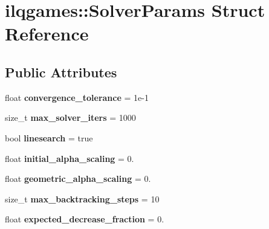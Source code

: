 \hypertarget{structilqgames_1_1_solver_params}{}\section{ilqgames\+:\+:Solver\+Params Struct Reference}
\label{structilqgames_1_1_solver_params}
\subsection*{Public Attributes}
\begin{DoxyCompactItemize}
\item 
float {\bfseries convergence\+\_\+tolerance} = 1e-\/1\hypertarget{structilqgames_1_1_solver_params_afe3985198f617a446e43e3d3a3c6ed2e}{}\label{structilqgames_1_1_solver_params_afe3985198f617a446e43e3d3a3c6ed2e}

\item 
size\+\_\+t {\bfseries max\+\_\+solver\+\_\+iters} = 1000\hypertarget{structilqgames_1_1_solver_params_a525076d6ad3f90a2fc5c410d88dc090f}{}\label{structilqgames_1_1_solver_params_a525076d6ad3f90a2fc5c410d88dc090f}

\item 
bool {\bfseries linesearch} = true\hypertarget{structilqgames_1_1_solver_params_af5c0bdc01591507e9a83f686a5be8e49}{}\label{structilqgames_1_1_solver_params_af5c0bdc01591507e9a83f686a5be8e49}

\item 
float {\bfseries initial\+\_\+alpha\+\_\+scaling} = 0.\hypertarget{structilqgames_1_1_solver_params_ac4b00024e1a74f611a0aeacbcdf91719}{}\label{structilqgames_1_1_solver_params_ac4b00024e1a74f611a0aeacbcdf91719}

\item 
float {\bfseries geometric\+\_\+alpha\+\_\+scaling} = 0.\hypertarget{structilqgames_1_1_solver_params_a36f6667fd24a5c763c6e03f67acbbcb8}{}\label{structilqgames_1_1_solver_params_a36f6667fd24a5c763c6e03f67acbbcb8}

\item 
size\+\_\+t {\bfseries max\+\_\+backtracking\+\_\+steps} = 10\hypertarget{structilqgames_1_1_solver_params_ad130123c76a7b90d41cf836e275dfef0}{}\label{structilqgames_1_1_solver_params_ad130123c76a7b90d41cf836e275dfef0}

\item 
float {\bfseries expected\+\_\+decrease\+\_\+fraction} = 0.\hypertarget{structilqgames_1_1_solver_params_a2e620d2c79edb6929394e1ee408a78d2}{}\label{structilqgames_1_1_solver_params_a2e620d2c79edb6929394e1ee408a78d2}


\end{DoxyCompactItemize}
